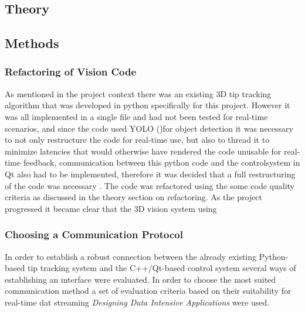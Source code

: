 
\subsection{Theory}


\subsection{Methods}

\subsubsection{Refactoring of Vision Code}
As mentioned in the project context there was an existing 3D tip tracking algorithm that was developed in python specifically for this project. However it was all implemented in a single file and had not been tested for real-time scenarios, and since the code used YOLO ()for object detection it was necessary to not only restructure the code for real-time use, but also to thread it to minimize latencies that would otherwise have rendered the code unusable for real-time feedback, communication between this python code and the controlsystem in Qt also had to be implemented, therefore it was decided that a full restructuring of the code was necessary
. The code was refactored using the some code quality criteria as discussed in the theory section on refactoring. 
\newline \newline
As the project progressed it became clear that the 3D vision system using 

\subsubsection{Choosing a Communication Protocol}
In order to establish a robust connection between the already existing Python-based tip tracking system and the C++/Qt-based control system several ways of establishing an interface were evaluated. In order to choose the most suited communication method a set of evaluation criteria based on their suitability for real-time dat streaming \textit{Designing Data Intensive Applications} \cite{kleppmann_designing_2017} were used.

